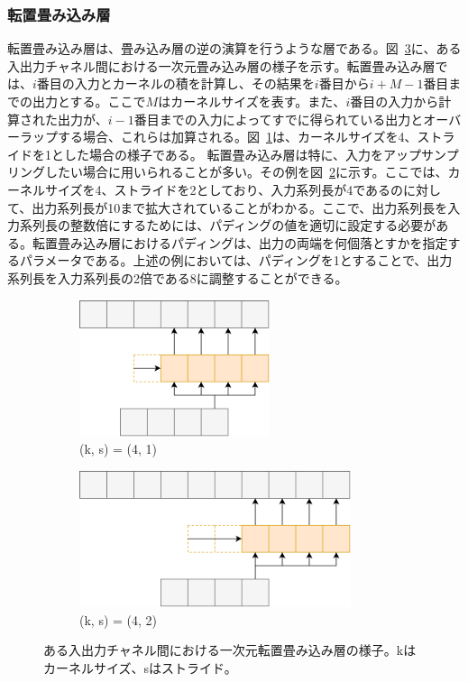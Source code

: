 \documentclass[12pt]{jarticle}
\numberwithin{equation}{section}    %
\numberwithin{figure}{section}      %
\numberwithin{table}{section}      %
\begin{document}
\subsubsection{転置畳み込み層}
転置畳み込み層は、畳み込み層の逆の演算を行うような層である。図~\ref{sec3:fig:tconv_variations}に、ある入出力チャネル間における一次元畳み込み層の様子を示す。転置畳み込み層では、$i$番目の入力とカーネルの積を計算し、その結果を$i$番目から$i + M - 1$番目までの出力とする。ここで$M$はカーネルサイズを表す。また、$i$番目の入力から計算された出力が、$i - 1$番目までの入力によってすでに得られている出力とオーバーラップする場合、これらは加算される。図~\ref{sec3:fig:tconv1}は、カーネルサイズを4、ストライドを1とした場合の様子である。
転置畳み込み層は特に、入力をアップサンプリングしたい場合に用いられることが多い。その例を図~\ref{sec3:fig:tconv2}に示す。ここでは、カーネルサイズを4、ストライドを2としており、入力系列長が4であるのに対して、出力系列長が10まで拡大されていることがわかる。ここで、出力系列長を入力系列長の整数倍にするためには、パディングの値を適切に設定する必要がある。転置畳み込み層におけるパディングは、出力の両端を何個落とすかを指定するパラメータである。上述の例においては、パディングを1とすることで、出力系列長を入力系列長の2倍である8に調整することができる。

\begin{figure}[tb]
    \centering
    \begin{subfigure}[b]{0.48\textwidth}
        \centering
        \includegraphics[height=4cm]{./figure/sec3/tconv1.drawio.png}
        \caption{(k, s) = (4, 1)}
        \label{sec3:fig:tconv1}
    \end{subfigure}
    \begin{subfigure}[b]{0.48\textwidth}
        \centering
        \includegraphics[height=4cm]{./figure/sec3/tconv2.drawio.png}
        \caption{(k, s) = (4, 2)}
        \label{sec3:fig:tconv2}
    \end{subfigure}
    \caption{ある入出力チャネル間における一次元転置畳み込み層の様子。kはカーネルサイズ、sはストライド。}
    \label{sec3:fig:tconv_variations}
\end{figure}
\end{document}
